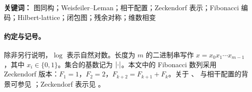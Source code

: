 
\begin{abstract}
本文提出一种离散且可计算的“折叠--回溯”闭包图模型：将长度为 $m$ 的二进制微观态集合 $X_m=\{0,1\}^{m}$ 通过 Zeckendorf 表示的\textbf{截断投影}映射到稳定宏观态集合 $Y_m$（无相邻 $1$ 的 Fibonacci/Zeckendorf 字），得到 $2^{m}\to F_{m+2}$ 的信息压缩；被截断的高位 Zeckendorf 尾部作为“时间纤维”保留。我们把折叠边与微观邻接（Hilbert-lattice、bit-split lattice、hypercube 等）合并成带颜色的闭包图，并把其图同构问题等价翻译到 Babai 体系中的 \textbf{\WL{}--相干配置}语言。通过穷举实验（$m=3$ 至 $18$）发现：一维/二维薄格导致 \WL{} 塌缩显著变慢，而三维及更高“适度维数”的格使塌缩步数近似常数；同时在少数“共振” $m$ 上出现残余 $\ZZ_2$ 纤维对称（不可恢复的正交时间位）。本文给出 \GI{}/\WL{} 的严格翻译定理、残余对称的可验证判据、以及可复现实验指标与开放问题，为将 $64\to 21$（$m=6$）作为最小闭合版本的离散内核提供可发表的数学与计算框架。
\end{abstract}

\begin{sloppypar}
\textbf{关键词：} 图同构；Weisfeiler--Leman；相干配置；Zeckendorf 表示；Fibonacci 编码；Hilbert-lattice；闭包图；残余对称；维数相变
\end{sloppypar}

\paragraph{约定与记号。}
除非另行说明，$\log$ 表示自然对数。长度为 $m$ 的二进制串写作 $x=x_0x_1\cdots x_{m-1}$，其中 $x_i\in\{0,1\}$。集合的基数记为 $\left\lvert \cdot\right\rvert$。本文中的 Fibonacci 数列采用 Zeckendorf 版本：$F_1=1$，$F_2=2$，$F_{k+2}=F_{k+1}+F_k$。关于 \GI{}、\WL{} 与相干配置的背景可参见 \cite{babai2016gi,wl2018symmetryvsregularity}；Zeckendorf 表示见 \cite{zeckendorf1972representation}。

